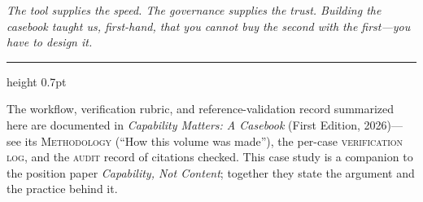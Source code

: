 \documentclass[11pt]{article}
\newcommand{\pullquote}[1]{%
  \begin{center}\begin{minipage}{0.86\linewidth}
  \color{lensquote}\itshape\large\RaggedRight #1
  \end{minipage}\end{center}}
\begin{document}
\pullquote{The tool supplies the speed. The governance supplies the trust. Building the casebook taught us, first-hand, that you cannot buy the second with the first---you have to design it.}

\vfill
{\color{lensrule}\hrule height 0.7pt}
\vspace{0.5em}
{\footnotesize\color{lensquote}
The workflow, verification rubric, and reference-validation record summarized here are documented in \emph{Capability Matters: A Casebook} (First Edition, 2026)---see its \textsc{Methodology} (``How this volume was made''), the per-case \textsc{verification log}, and the \textsc{audit} record of citations checked. This case study is a companion to the position paper \emph{Capability, Not Content}; together they state the argument and the practice behind it.}
\end{document}
